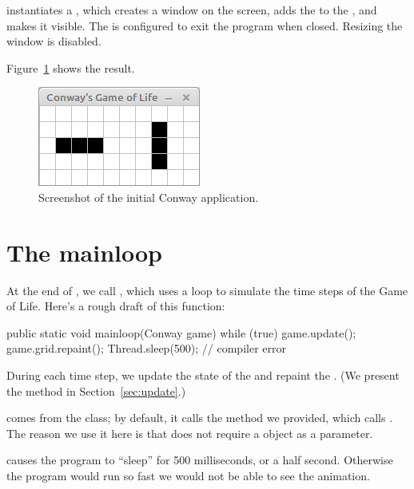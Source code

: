  instantiates a , which creates a window on the screen, adds the  to the , and makes it visible.
The  is configured to exit the program when closed.
Resizing the window is disabled.

Figure~\ref{fig:conway} shows the result.

\begin{figure}[!ht]
\begin{center}
\includegraphics{figs/conway.png}
\caption{Screenshot of the initial Conway application.}
\label{fig:conway}
\end{center}
\end{figure}


\section{The mainloop}
\label{mainloop}

At the end of , we call , which uses a
 loop to simulate the time steps of the Game of Life.
Here's a rough draft of this function:

\begin{code}
public static void mainloop(Conway game) {
    while (true) {
        game.update();
        game.grid.repaint();
        Thread.sleep(500);    // compiler error
    }
}
\end{code}

During each time step, we update the state of the  and repaint the .
(We present the  method in Section~\ref{sec:update}.)

 comes from the  class; by default, it calls the  method we provided, which calls .
The reason we use it here is that  does not require a  object as a parameter.

 causes the program to ``sleep'' for 500 milliseconds, or a half second.
Otherwise the program would run so fast we would not be able to see the animation. 


